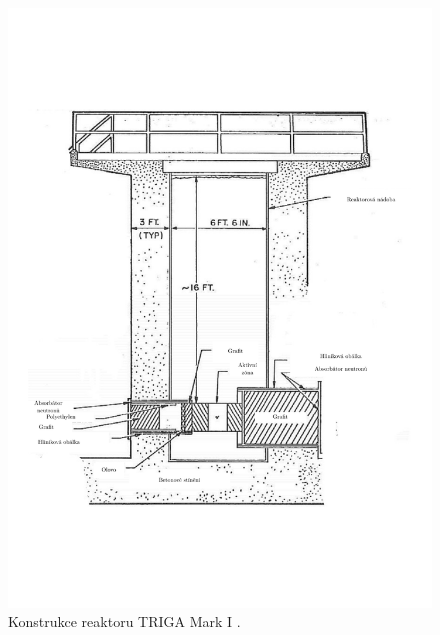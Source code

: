 \begin{figure}
	\centering
	\includegraphics[width=\textwidth, trim={0cm 0cm 0cm 0cm}, clip]{./07_prilohy/obrazky/triga_geometrie.pdf}
	\caption{Konstrukce reaktoru TRIGA Mark I \cite{TRIGA_CFD}.}
	\label{fig:triga_geometrie}
\end{figure}

